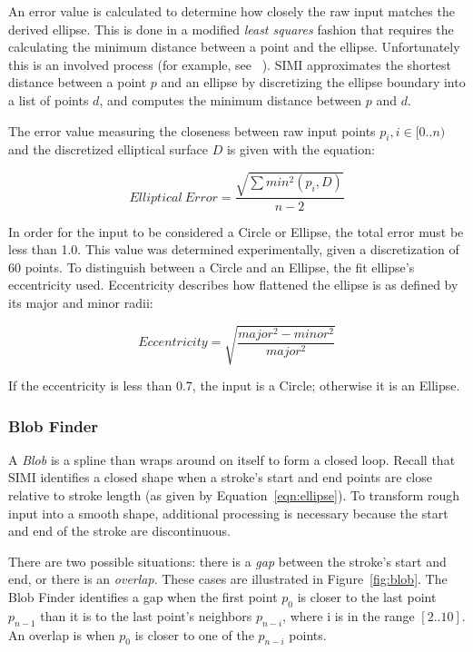 An error value is calculated to determine how closely the raw input
matches the derived ellipse. This is done in a modified \textit{least
  squares} fashion that requires the calculating the minimum distance
between a point and the ellipse. Unfortunately this is an involved
process (for example, see ~\cite{eberly-point-to-ellipse}). SIMI
approximates the shortest distance between a point $p$ and an ellipse
by discretizing the ellipse boundary into a list of points $d$, and
computes the minimum distance between $p$ and $d$.

The error value measuring the closeness between raw input points $p_i,
i \in [0..n)$ and the discretized elliptical surface $D$ is given with
  the equation:

\begin{equation}
Elliptical\:Error = \frac{
\sqrt{
\sum min^2(p_i, D)
}
}{
n-2
}
\end{equation}

In order for the input to be considered a Circle or Ellipse, the total
error must be less than 1.0. This value was determined experimentally,
given a discretization of 60 points. To distinguish between a Circle
and an Ellipse, the fit ellipse's eccentricity used. Eccentricity
describes how flattened the ellipse is as defined by its major and
minor radii:

\begin{equation}
Eccentricity = \sqrt{\dfrac{major^2-minor^2}{major^2}}
\end{equation}

If the eccentricity is less than 0.7, the input is a Circle; otherwise
it is an Ellipse.

\subsubsection{Blob Finder}

A \textit{Blob} is a spline than wraps around on itself to form a
closed loop. Recall that SIMI identifies a closed shape when a
stroke's start and end points are close relative to stroke length (as
given by Equation~\ref{eqn:ellipse}). To transform rough input into a
smooth shape, additional processing is necessary because the start and
end of the stroke are discontinuous.



There are two possible situations: there is a \textit{gap} between the
stroke's start and end, or there is an \textit{overlap}. These cases
are illustrated in Figure~\ref{fig:blob}. The Blob Finder identifies a
gap when the first point $p_0$ is closer to the last point $p_{n-1}$
than it is to the last point's neighbors $p_{n-i}$, where i is in the
range $[2..10]$. An overlap is when $p_0$ is closer to one of the
$p_{n-i}$ points.

